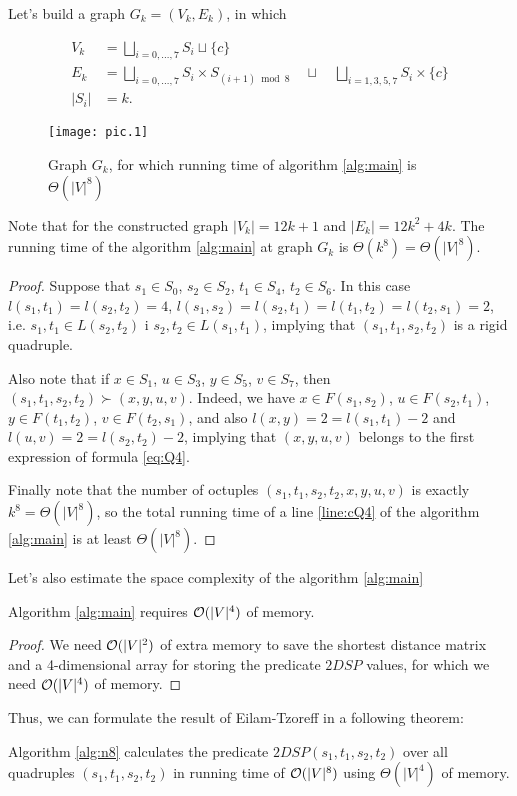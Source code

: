 \begin{theorem}
Let's build a graph $G_k = (V_k, E_k)$, in which

\begin{align}
V_k &= \bigsqcup\limits_{i = 0,\ldots,7} S_i \sqcup \{c\} \\
E_k &= \bigsqcup\limits_{i = 0,\ldots,7} S_i \times S_{(i+1) \bmod 8} \quad\sqcup\quad \bigsqcup\limits_{i=1,3,5,7} S_i \times \{c\} \\
|S_i| &= k.
\end{align}

\begin{figure}[H]
\caption{Graph $G_k$, for which running time of algorithm \ref{alg:main} is $\Theta(|V|^8)$}
\centering
\texttt{[image: pic.1]}
\end{figure}

Note that for the constructed graph $|V_k| = 12k + 1$ and $|E_k| = 12k^2 + 4k$. The running time of the algorithm \ref{alg:main} at graph $G_k$ is $\Theta(k^8) = \Theta(|V|^8)$.

\end{theorem}
\begin{proof}
Suppose that $s_1 \in S_0$, $s_2 \in S_2$, $t_1 \in S_4$, $t_2 \in S_6$. In this case $l(s_1, t_1) = l(s_2, t_2) = 4$, $l(s_1, s_2) = l(s_2, t_1) = l(t_1, t_2) = l(t_2, s_1) = 2$, i.e. $s_1, t_1 \in L(s_2, t_2)$ i $s_2, t_2 \in L(s_1, t_1)$, implying that $(s_1, t_1, s_2, t_2)$ is a rigid quadruple.

Also note that if $x \in S_1$, $u \in S_3$, $y \in S_5$, $v \in S_7$, then $(s_1, t_1, s_2, t_2) \succ (x, y, u, v)$. Indeed, we have $x \in F(s_1, s_2)$, $u \in F(s_2, t_1)$, $y \in F(t_1, t_2)$, $v \in F(t_2, s_1)$, and also $l(x, y) = 2 = l(s_1, t_1) - 2$ and $l(u, v) = 2 = l(s_2, t_2) - 2$, implying that $(x, y, u, v)$ belongs to the first expression of formula \ref{eq:Q4}.

Finally note that the number of octuples $(s_1, t_1, s_2, t_2, x, y, u, v)$ is exactly $k^8 = \Theta(|V|^8)$, so the total running time of a line \ref{line:cQ4} of the algorithm \ref{alg:main} is at least $\Theta(|V|^8)$.
\end{proof}

Let's also estimate the space complexity of the algorithm \ref{alg:main}
\begin{theorem}
Algorithm \ref{alg:main} requires $\mathcal{O}(|V|^4)$ of memory.
\end{theorem}
\begin{proof}
We need $\mathcal{O}(|V|^2)$ of extra memory to save the shortest distance matrix and a 4-dimensional array for storing the predicate $2DSP$ values, for which we need $\mathcal{O}(|V|^4)$ of memory.
\end{proof}

Thus, we can formulate the result of Eilam-Tzoreff in a following theorem: 

\begin{theorem} 
Algorithm \ref{alg:n8} calculates the predicate $2DSP(s_1, t_1, s_2, t_2)$ over all quadruples $(s_1, t_1, s_2, t_2)$ in running time of $\mathcal{O}(|V|^8)$ using $\Theta(|V|^4)$ of memory. 
\end{theorem}
